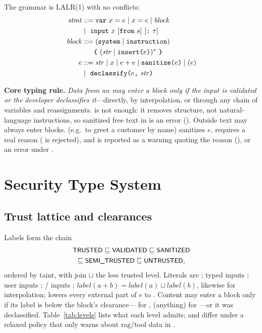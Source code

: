 \documentclass[conference]{IEEEtran}
\begin{document}
The grammar is LALR(1) with no conflicts:
{\small
\begin{align*}
\mathit{stmt} &::= \texttt{var}\ x = e \mid x = e \mid \mathit{block}\\
 &\mid\ \texttt{input}\ x\ [\texttt{from}\ s]\ [\texttt{:}\ \tau]\\
\mathit{block} &::= (\texttt{system} \mid \texttt{instruction})\\
 &\phantom{::=}\ \texttt{\{}\ (\mathit{str} \mid \texttt{insert(}e\texttt{)})^{*}\ \texttt{\}}\\
e &::= \mathit{str} \mid x \mid e + e \mid \texttt{sanitize(}e\texttt{)} \mid (e)\\
 &\mid\ \texttt{declassify(}e\texttt{,}\ \mathit{str}\texttt{)}
\end{align*}}

\textbf{Core typing rule.} \emph{Data from an  may enter a  block only if the input is validated or the developer declassifies it}---directly, by interpolation, or through any chain of variables and reassignments.  is not enough: it removes structure, not natural-language instructions, so sanitized free text in  is an error (). Outside text may always enter  blocks.  (e.g.\ to greet a customer by name) sanitizes $e$, requires a real reason ( is rejected), and is reported as a warning quoting the reason (), or an error under .

\section{Security Type System}\label{sec:types}

\subsection{Trust lattice and clearances}
Labels form the chain
\begin{gather*}
\textsf{\small TRUSTED} \sqsubseteq \textsf{\small VALIDATED} \sqsubseteq \textsf{\small SANITIZED}\\
\sqsubseteq \textsf{\small SEMI\_TRUSTED} \sqsubseteq \textsf{\small UNTRUSTED},
\end{gather*}
ordered by taint, with join $\sqcup$ the less trusted level. Literals are ; typed inputs ; user inputs ; / inputs ; $\mathit{label}(a+b) = \mathit{label}(a)\sqcup\mathit{label}(b)$, likewise for interpolation;  lowers every external part of $e$ to . Content may enter a block only if its label is below the block's clearance--- for ,  (anything) for ---or it was declassified. Table~\ref{tab:levels} lists what each level admits;  and  differ under a relaxed policy that only warns about rag/tool data in .
\end{document}
